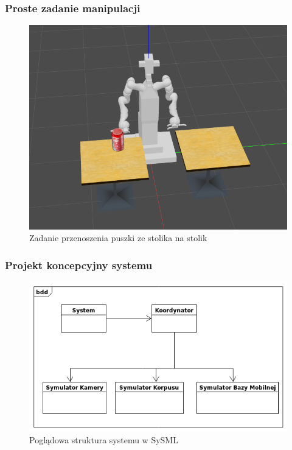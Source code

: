 \begin{frame}
    \frametitle{Proste zadanie manipulacji}
    \begin{figure}
        \includegraphics[scale=0.35]{./images/velma_stero_task.png}
        \caption{Zadanie przenoszenia puszki ze stolika na stolik}
    \end{figure}
\end{frame}


\begin{frame}
	\frametitle{Projekt koncepcyjny systemu}
	\bigskip
	\begin{figure}
        \includegraphics[scale=0.5]{./images/example_bdd.png}
        \caption{Poglądowa struktura systemu w SySML}
    \end{figure}
\end{frame}

